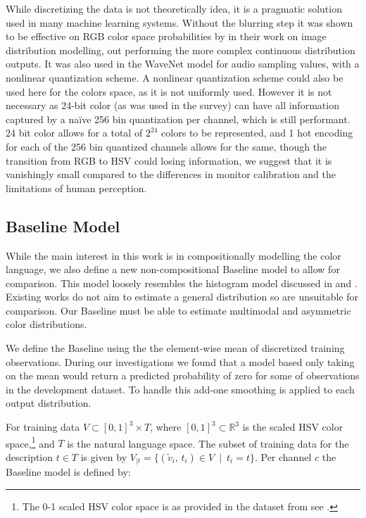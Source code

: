 \documentclass[11pt,letterpaper, twocolumn]{article}
\newcommand{\parencite}{\citep}
\newcommand{\textcite}{\cite}
\begin{document}
While discretizing the data is not theoretically idea, it is a pragmatic solution used in many machine learning systems.
Without the blurring step it was shown to be effective on RGB color space probabilities by \textcite{oord2016pixel} in their work on image distribution modelling, out performing the more complex continuous distribution outputs. 
It was also used in the WaveNet model \parencite{DBLP:journals/corr/OordDZSVGKSK16} for audio sampling values, with a nonlinear quantization scheme.
A nonlinear quantization scheme could also be used here for the colors space, as it is not uniformly used.
However it is not necessary as 24-bit color (as was used in the survey) can have all information captured by a na\"ive 256 bin quantization per channel, which is still performant.
24 bit color allows for a total of $2^{24}$ colors to be represented, and 1 hot encoding for each of the 256 bin quantized channels allows for the same, though the transition from RGB to HSV could losing information, we suggest that it is vanishingly small compared to the differences in monitor calibration and the limitations of human perception.



\subsection{Baseline Model}\label{sec:Baseline-model}
While the main interest in this work is in compositionally modelling the color language,
we also define a new non-compositional Baseline model to allow for comparison.
This model loosely resembles the histogram model discussed in \textcite{meomcmahanstone:color} and \textcite{mcmahan2015bayesian}.
Existing works do not aim to estimate a general distribution so are unsuitable for comparison.
Our Baseline must be able to estimate multimodal and asymmetric color distributions.

We define the Baseline using the the element-wise mean of discretized  training observations.
During our investigations we found that a model based only taking on the mean would return a predicted probability of zero for some of observations in the development dataset.
To handle this add-one smoothing is applied to each output distribution.

For training data $V \subset \left[ 0,1 \right] ^{3}\times T$, where $\left[ 0,1 \right] ^{3} \subset \mathbb{R}^{3}$ is the scaled HSV color space,\footnote{The 0-1 scaled HSV color space is as provided in the dataset from \textcite{mcmahan2015bayesian} see .} and $T$ is the natural language space.
The subset of training data for the description $t \in T$ is given by
$V_{|t}=\{(\tilde{v}_i,\,t_i) \in V \: \mid \: t_{i}=t\}$.
Per channel $c$ the Baseline model is defined by: 
\end{document}
